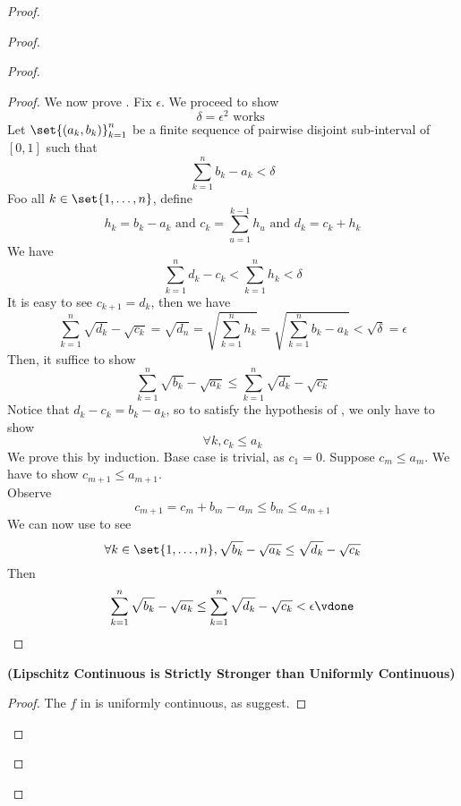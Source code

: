\documentclass{report}
\begin{document}
\begin{proof}
\begin{proof}
\begin{proof}
\begin{proof}
We now prove . Fix $\epsilon $. We proceed to show 
\begin{equation*}
\delta=\epsilon ^2\text{ works }
\end{equation*}
Let $\set{(a_k,b_k)}_{k=1}^n$ be a finite sequence of pairwise disjoint sub-interval of $[0,1]$ such that 
\begin{equation*}
\sum_{k=1}^n b_k-a_k<\delta
\end{equation*}
Foo all $k\in \set{1,\dots ,n}$, define 
\begin{equation*}
h_k=b_k-a_k\text{ and }c_k=\sum_{u=1}^{k-1} h_u \text{ and }d_k=c_k+h_k
\end{equation*}
We have
\begin{equation*}
\sum_{k=1}^n d_k-c_k<\sum_{k=1}^n h_k<\delta
\end{equation*}
It is easy to see $c_{k+1}=d_k$, then we have
\begin{equation*}
\sum_{k=1}^n \sqrt{d_k}-\sqrt{c_k}=\sqrt{d_n}=\sqrt{\sum_{k=1}^n h_k}=\sqrt{\sum_{k=1}^n b_k-a_k}<\sqrt{\delta} =\epsilon  
\end{equation*}
Then, it suffice to show 
\begin{equation*}
\sum_{k=1}^n \sqrt{b_k} -\sqrt{a_k} \leq \sum_{k=1}^n \sqrt{d_k} -\sqrt{c_k} 
\end{equation*}
Notice that $d_k-c_k=b_k-a_k$, so to satisfy the hypothesis of , we only have to show 
\begin{equation*}
\forall k, c_k\leq a_k
\end{equation*}
We prove this by induction. Base case is trivial, as $c_1=0$. Suppose $c_m\leq a_m$. We have to show $c_{m+1}\leq a_{m+1}$.\\

Observe 
\begin{equation*}
c_{m+1}=c_m+b_m-a_m\leq b_m\leq a_{m+1}
\end{equation*}
We can now use  to see 
\begin{equation*}
\forall k\in \set{1,\dots ,n}, \sqrt{b_k} -\sqrt{a_k} \leq \sqrt{d_k} -\sqrt{c_k}  
\end{equation*}
Then 
\begin{equation*}
\sum_{k=1}^n \sqrt{b_k} -\sqrt{a_k}\leq \sum_{k=1}^n \sqrt{d_k} -\sqrt{c_k}<\epsilon \vdone
\end{equation*}
\end{proof}
\begin{corollary}
\label{5.5.9}
 \textbf{(Lipschitz Continuous is Strictly Stronger than Uniformly Continuous)} 
\end{corollary}
\begin{proof}
The $f$ in  is uniformly continuous, as  suggest.
\end{proof}

\end{proof}
\end{proof}
\end{proof}
\end{document}
